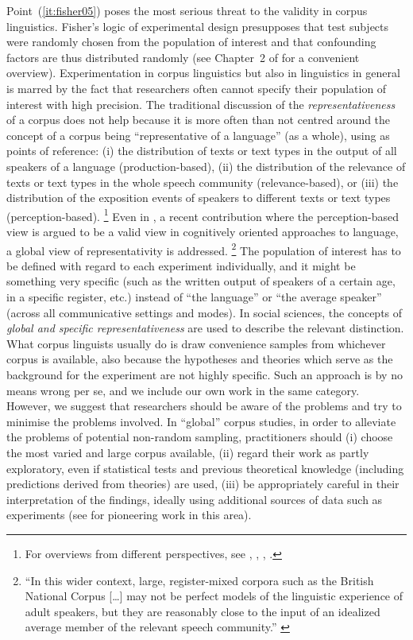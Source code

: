 Point~(\ref{it:fisher05}) poses the most serious threat to the validity in corpus linguistics.
Fisher's logic of experimental design presupposes that test subjects were randomly chosen from the population of interest and that confounding factors are thus distributed randomly (see Chapter~2 of \citealt{MaxwellDelaney2004} for a convenient overview).
Experimentation in corpus linguistics but also in linguistics in general is marred by the fact that researchers often cannot specify their population of interest with high precision.
The traditional discussion of the \textit{representativeness} of a corpus does not help because it is more often than not centred around the concept of a corpus being ``representative of a language'' (as a whole), using as points of reference:
(i) the distribution of texts or text types in the output of all speakers of a language (production-based),
(ii) the distribution of the relevance of texts or text types in the whole speech community (relevance-based), or
(iii) the distribution of the exposition events of speakers to different texts or text types (perception-based).%
\footnote{For overviews from different perspectives, see \textcite{Biber1993}, \textcite{MceneryEa2006}, \textcite{Leech2007}, \textcite{Hunston2008}.}
Even in \textcite{StefanowitschFlach2016}, a recent contribution where the perception-based view is argued to be a valid view in cognitively oriented approaches to language, a global view of representativity is addressed.%
\footnote{``In this wider context, large, register-mixed corpora such as the British National Corpus [\ldots] may not be perfect models of the linguistic experience of adult speakers, but they are reasonably close to the input of an idealized average member of the relevant speech community.'' \parencite[104]{StefanowitschFlach2016}}
The population of interest has to be defined with regard to each experiment individually, and it might be something very specific (such as the written output of speakers of a certain age, in a specific register, etc.) instead of ``the language'' or ``the average speaker'' (across all communicative settings and modes).
In social sciences, the concepts of \textit{global and specific representativeness} \citep[86]{Bortz2005} are used to describe the relevant distinction.
What corpus linguists usually do is draw convenience samples from whichever corpus is available, also because the hypotheses and theories which serve as the background for the experiment are not highly specific.
Such an approach is by no means wrong per se, and we include our own work in the same category.
However, we suggest that researchers should be aware of the problems and try to minimise the problems involved.
In ``global'' corpus studies, in order to alleviate the problems of potential non-random sampling, practitioners should
(i) choose the most varied and large corpus available,
(ii) regard their work as partly exploratory, even if statistical tests and previous theoretical knowledge (including predictions derived from theories) are used,
(iii) be appropriately careful in their interpretation of the findings, ideally using additional sources of data such as experiments (see \citealt{BresnanEa2007} for pioneering work in this area).

